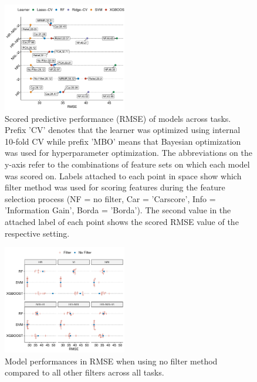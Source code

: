 \documentclass[letterpaper, peerreview]{IEEEtran}
\begin{document}
\begin{figure} [t!]
	\centering
	\begin{center}
		\includegraphics[width=0.48\textwidth] {performance-results-1.pdf}
		\caption{Scored predictive performance (RMSE) of models across tasks. Prefix 'CV' denotes that the learner was optimized using internal 10-fold CV while prefix 'MBO' means that Bayesian optimization was used for hyperparameter optimization. The abbreviations on the y-axis refer to the combinations of feature sets on which each model was scored on. Labels attached to each point in space show which filter method was used for scoring features during the feature selection process (NF = no filter, Car = 'Carscore', Info = 'Information Gain', Borda = 'Borda'). The second value in the attached label of each point shows the scored RMSE value of the respective setting.}\label{fig:perf-result}
	\end{center}
\end{figure}

\begin{figure} [t!]
	\centering
	\begin{center}
		\includegraphics[width=0.48\textwidth] {filter-effect-all-vs-no-filter-1.pdf}
		\caption{Model performances in RMSE when using no filter method compared to all other filters across all tasks.}\label{fig:filter-effects-no-filter}
	\end{center}
\end{figure}
\end{document}
